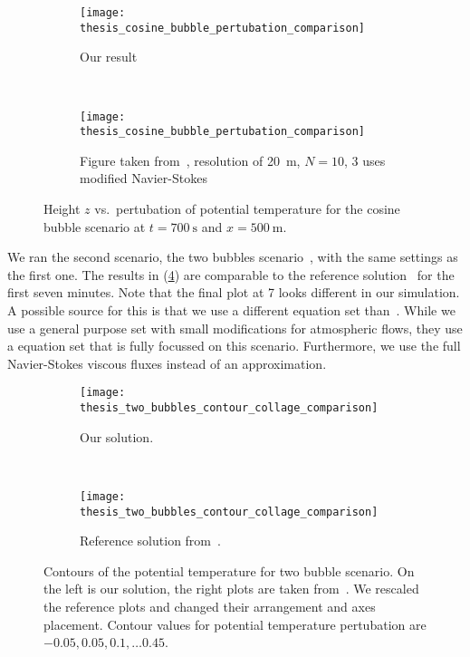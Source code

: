 \begin{figure}[htb]
  \centering
  \begin{subfigure}[t]{0.45\textwidth}
    \centering
    \texttt{[image: thesis\_cosine\_bubble\_pertubation\_comparison]}
    \caption{\label{fig:cosine-bubble-potT-ours}%
      Our result}
  \end{subfigure}~%
  \begin{subfigure}[t]{0.55\textwidth}
    \centering
    \texttt{[image: thesis\_cosine\_bubble\_pertubation\_comparison]}
    \caption{\label{fig:cosine-bubble-potT-giraldo}%
      Figure taken from~\cite{giraldo2008study}, resolution of \SI{20}{\m}, $N = 10$, \dg{}3 uses modified Navier-Stokes} %
  \end{subfigure}
  \caption{\label{fig:cosine-bubble-potT}%
    Height $z$ vs.\ pertubation of potential temperature for the cosine bubble scenario at $t=\SI{700}{\s}$ and $x = \SI{500}{\m}$.
  }
\end{figure}

We ran the second scenario, the two bubbles scenario~, with the same \amr{} settings as the first one.
The results in (\cref{fig:two-bubbles-contour}) are comparable to the reference solution~\cite{muller2010adaptive} for the first seven minutes.
Note that the final plot at \SI{7}{\min} looks different in our simulation.
A possible source for this is that we use a different equation set than~\cite{muller2010adaptive}.
While we use a general purpose set with small modifications for atmospheric flows, they use a equation set that is fully focussed on this scenario.
Furthermore, we use the full Navier-Stokes viscous fluxes instead of an approximation.

\begin{figure}[p]
  \vspace*{-1cm}
  \centering
  \begin{subfigure}[t]{0.5\textwidth}
    \centering
  \texttt{[image: thesis\_two\_bubbles\_contour\_collage\_comparison]} 
  \caption{Our \amr{} solution.}
  \end{subfigure}~%
  \begin{subfigure}[t]{0.5\textwidth}
    \centering
  \texttt{[image: thesis\_two\_bubbles\_contour\_collage\_comparison]} 
  \caption{Reference solution from~\cite{muller2010adaptive}.}
  \end{subfigure}
  \caption{\label{fig:two-bubbles-contour}%
     Contours of the potential temperature for two bubble scenario.
     On the left is our solution, the right plots are taken from~\cite{muller2010adaptive}.
     We rescaled the reference plots and changed their arrangement and axes placement.
   Contour values for potential temperature pertubation are $-0.05, 0.05, 0.1, \ldots 0.45$.
  }
\end{figure}

